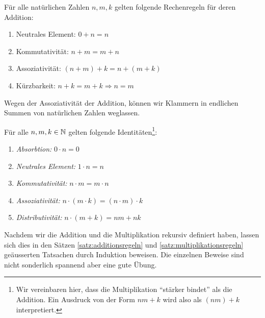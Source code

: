 \begin{satz}\label{satz:additionsregeln}
Für alle natürlichen Zahlen $n,m,k$ gelten folgende Rechenregeln für deren Addition:
\begin{enumerate}
\item Neutrales Element: $0+n=n$
\item Kommutativität: $n+m=m+n$
\item Assoziativität: $(n+m)+k=n+(m+k)$
\item Kürzbarkeit: $n+k=m+k\Rightarrow n=m$
\end{enumerate}
\end{satz}


\begin{rk}
Wegen der Assoziativität der Addition, können wir Klammern in endlichen Summen von natürlichen Zahlen weglassen.
\end{rk}




\begin{satz}\label{satz:multiplikationsregeln}
Für alle $n,m,k\in\mathbb{N}$ gelten folgende Identitäten\footnote{Wir vereinbaren hier, dass die Multiplikation ``stärker bindet'' als die Addition. Ein Ausdruck von der Form $nm+k$ wird also als $(nm)+k$ interpretiert.}:
\begin{enumerate}
\item \textit{Absorbtion:} $0\cdot n=0$
\item \textit{Neutrales Element:} $1\cdot n=n$
\item \textit{Kommutativität:} $n\cdot m=m\cdot n$
 \item \textit{Assoziativität:} $n\cdot(m\cdot k)=(n\cdot m)\cdot k$
\item \textit{Distributivität:} $n\cdot(m+k)=nm+nk$
\end{enumerate}
\end{satz}
\begin{ueb}
	Nachdem wir die Addition und die Multiplikation rekursiv definiert haben, lassen sich dies in den Sätzen \ref{satz:additionsregeln} und \ref{satz:multiplikationsregeln} geäusserten Tatsachen durch Induktion beweisen. Die einzelnen Beweise sind nicht sonderlich spannend aber eine gute Übung.
\end{ueb}


